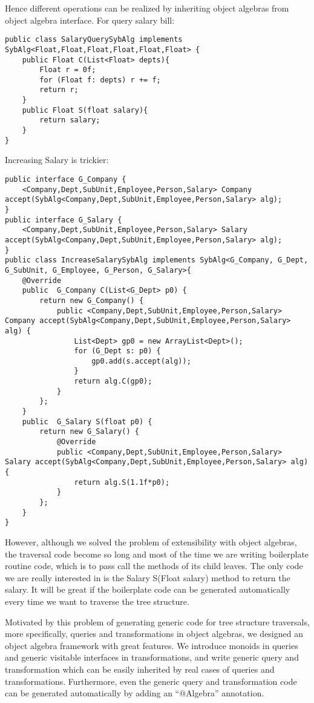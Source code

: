Hence different operations can be realized by inheriting object algebras from object algebra interface. For query salary bill: 
\begin{lstlisting}
public class SalaryQuerySybAlg implements SybAlg<Float,Float,Float,Float,Float,Float> {
	public Float C(List<Float> depts){
		Float r = 0f;
		for (Float f: depts) r += f;
		return r;
	}
	public Float S(float salary){
		return salary;
	}
}
\end{lstlisting}
Increasing Salary is trickier: 
\begin{lstlisting}
public interface G_Company {
	<Company,Dept,SubUnit,Employee,Person,Salary> Company accept(SybAlg<Company,Dept,SubUnit,Employee,Person,Salary> alg);
}
public interface G_Salary {
	<Company,Dept,SubUnit,Employee,Person,Salary> Salary accept(SybAlg<Company,Dept,SubUnit,Employee,Person,Salary> alg);
}
public class IncreaseSalarySybAlg implements SybAlg<G_Company, G_Dept, G_SubUnit, G_Employee, G_Person, G_Salary>{
	@Override
	public  G_Company C(List<G_Dept> p0) {
		return new G_Company() {
			public <Company,Dept,SubUnit,Employee,Person,Salary> Company accept(SybAlg<Company,Dept,SubUnit,Employee,Person,Salary> alg) {
				List<Dept> gp0 = new ArrayList<Dept>();
				for (G_Dept s: p0) {
					gp0.add(s.accept(alg));
				}
				return alg.C(gp0);
			}
		};
	}
	public  G_Salary S(float p0) {
		return new G_Salary() {
			@Override
			public <Company,Dept,SubUnit,Employee,Person,Salary> Salary accept(SybAlg<Company,Dept,SubUnit,Employee,Person,Salary> alg) {
				return alg.S(1.1f*p0);
			}
		};
	}
}
\end{lstlisting}

However, although we solved the problem of extensibility with object algebras, the traversal code become so long and most of the time we are writing boilerplate routine code, which is to pass call the methods of its child leaves. The only code we are really interested in is the Salary S(Float salary) method to return the salary. It will be great if the boilerplate code can be generated automatically every time we want to traverse the tree structure. 

Motivated by this problem of generating generic code for tree structure traversals, more specifically, queries and transformations in object algebras, we designed an object algebra framework with great features. We introduce monoids in queries and generic visitable interfaces in transformations, and write generic query and transformation which can be easily inherited by real cases of queries and transformations. Furthermore, even the generic query and transformation code can be generated automatically by adding an ``$@$Algebra'' annotation. 
